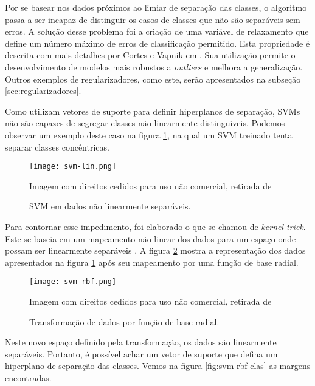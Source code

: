 Por se basear nos dados próximos ao limiar de separação das classes, o algoritmo passa a ser incapaz de distinguir os casos de classes que não são separáveis sem erros. A solução desse problema foi a criação de uma variável de relaxamento que define um número máximo de erros de classificação permitido. Esta propriedade é descrita com mais detalhes por Cortes e Vapnik em \cite{cortes95}. Sua utilização permite o desenvolvimento de modelos mais robustos a \textit{outliers} e melhora a generalização. Outros exemplos de regularizadores, como este, serão apresentados na subseção \ref{sec:regularizadores}.

Como utilizam vetores de suporte para definir hiperplanos de separação, SVMs não são capazes de segregar classes não linearmente distinguiveis. Podemos observar um exemplo deste caso na figura \ref{fig:svm-lin}, na qual um SVM treinado tenta separar classes concêntricas.

\begin{figure}
\begin{center} {
    \begin{center}
    \texttt{[image: svm-lin.png]}
    \caption{SVM em dados não linearmente separáveis.}
    \small Imagem com direitos cedidos para uso não comercial, retirada de \cite{vanderplas15}
    \label{fig:svm-lin}
    \end{center}
}
\end{center}
\end{figure}

Para contornar esse impedimento, foi elaborado o que se chamou de \textit{kernel trick}. Este se baseia em um mapeamento não linear dos dados para um espaço onde possam ser linearmente separáveis \cite{scholkopf02}. A figura \ref{fig:svm-rbf} mostra a representação dos dados apresentados na figura \ref{fig:svm-lin} após seu mapeamento por uma função de base radial.

\begin{figure}
\begin{center} {
    \begin{center}
    \texttt{[image: svm-rbf.png]}
    \caption{Transformação de dados por função de base radial.}
    \small Imagem com direitos cedidos para uso não comercial, retirada de \cite{vanderplas15}
    \label{fig:svm-rbf}
    \end{center}
}
\end{center}
\end{figure}

Neste novo espaço definido pela transformação, os dados são linearmente separáveis. Portanto, é possível achar um vetor de suporte que defina um hiperplano de separação das classes. Vemos na figura \ref{fig:svm-rbf-clas} as margens encontradas.

